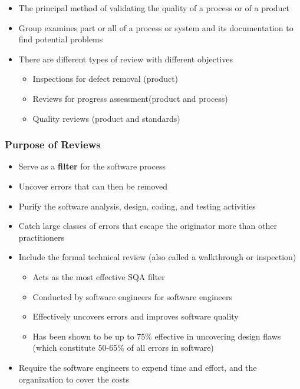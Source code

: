 \documentclass{article}
\begin{document}
\begin{itemize}
  \item The principal method of validating the quality of a process or of a product
  \item Group examines part or all of a process or system and its documentation to find potential problems
  \item There are different types of review with different objectives
  \begin{itemize}
    \item Inspections for defect removal (product)
    \item Reviews for progress assessment(product and process)
    \item Quality reviews (product and standards)
  \end{itemize}
\end{itemize}

\subsubsection{Purpose of Reviews}

\begin{itemize}
  \item Serve as a \textbf{filter} for the software process
  \item Uncover errors that can then be removed
  \item Purify the software analysis, design, coding, and testing activities
  \item Catch large classes of errors that escape the originator more than other practitioners
  \item Include the formal technical review (also called a walkthrough or inspection)
  \begin{itemize}
    \item Acts as the most effective SQA filter
    \item Conducted by software engineers for software engineers
    \item Effectively uncovers errors and improves software quality
    \item Has been shown to be up to 75\% effective in uncovering design flaws (which constitute 50-65\% of all errors in software)
  \end{itemize}
  \item Require the software engineers to expend time and effort, and the organization to cover the costs
\end{itemize}
\end{document}
